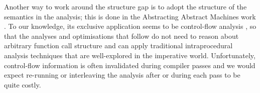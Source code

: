 Another way to work around the structure gap is to adopt the structure of the
semantics in the analysis; this is done in the Abstracting Abstract
Machines work \citep{aam}.
To our knowledge, its exclusive application seems to be control-flow analysis
\citep{Shivers:91}, so that the analyses and optimisations that follow do not
need to reason about arbitrary function call structure and can apply traditional
intraprocedural analysis techniques that are well-explored in the imperative
world.
Unfortunately, control-flow information is often invalidated during compiler
passes and we would expect re-running or interleaving the analysis after or
during each pass to be quite costly.
